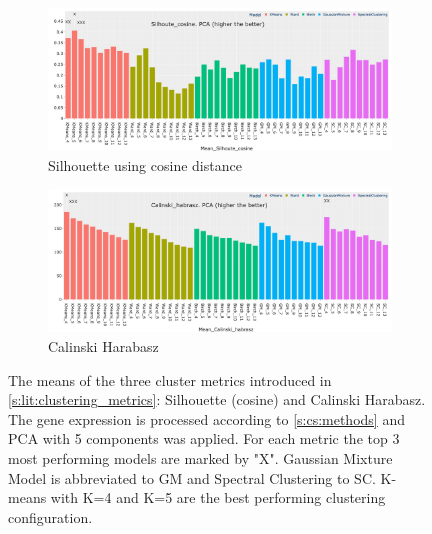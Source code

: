 \begin{figure}[!htb]
    \captionsetup[subfigure]{justification=Centering}
    \centering
    \begin{subfigure}[!t]{1.0\textwidth}
        \includegraphics[width=\textwidth,keepaspectratio]{Sections/ClusteringAnalysis/Resources/cs_top3/PCA_top3_Silhoute_cosine.png}
        \caption{Silhouette using cosine distance}
        \label{fig:cs:cosine}
    \end{subfigure}
    \centering
    \begin{subfigure}[!t]{1.0\textwidth}
        \includegraphics[width=\textwidth,keepaspectratio]{Sections/ClusteringAnalysis/Resources/cs_top3/PCA_top3_Calinski_habrasz.png}
        \caption{Calinski Harabasz}
        \label{fig:cs:cal_hab}
    \end{subfigure}
    \caption{The means of the three cluster metrics introduced in \cref{s:lit:clustering_metrics}: Silhouette (cosine) and Calinski Harabasz. The gene expression is processed according to \cref{s:cs:methods} and PCA with 5 components was applied. For each metric the top 3 most performing models are marked by "X". Gaussian Mixture Model is abbreviated to GM and Spectral Clustering to SC. K-means with K=4 and K=5 are the best performing clustering configuration.}
    \label{fig:cs:cs_metrics}
\end{figure}



